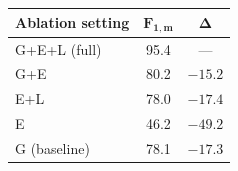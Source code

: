 \begin{tabular}{lcc}
\toprule
\textbf{Ablation setting} & $\mathbf{F_{1,m}}$ & $\mathbf{\Delta}$ \\
\midrule
G+E+L (full) & 95.4 & --- \\
G+E & 80.2 & $-15.2$ \\
E+L & 78.0 & $-17.4$ \\
E & 46.2 & $-49.2$ \\
G (baseline) & 78.1 & $-17.3$ \\
\bottomrule
\end{tabular}
